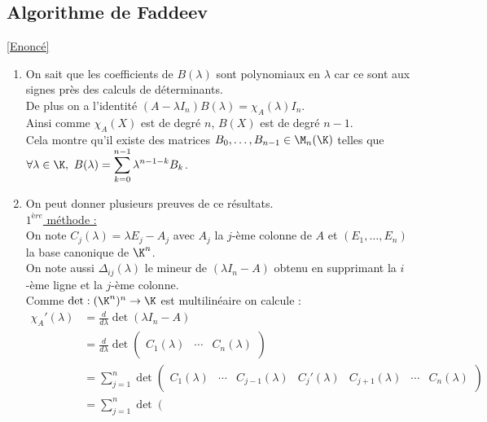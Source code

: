 \documentclass[8pt]{book}
\begin{document}
	\subsection{Algorithme de Faddeev}
	\label{Algorithme de Faddeev corrigé}
	\textcolor{blue}{\hyperref[Algorithme de Faddeev]{[Enoncé]}}\\
	\begin{enumerate}[leftmargin=*]
		\item On sait que les coefficients de $B(\lambda)$ sont polynomiaux en $\lambda$ car ce sont aux signes près des calculs de déterminants.\\
		De plus on a l'identité $(A-\lambda I_n)B(\lambda)=\chi_A(\lambda)I_n$.\\
		Ainsi comme $\chi_A(X)$ est de degré $n$, $B(X)$ est de degré $n-1$.\\
		Cela montre qu'il existe des matrices $B_0,\dots,B_{n-1}\in \M_n(\K)$ telles que $\forall \lambda\in \K,\ B(\lambda)=\displaystyle\sum_{k=0}^{n-1}\lambda^{n-1-k}B_k$.
		\item On peut donner plusieurs preuves de ce résultats.\\
		\underline{$1^{ère}$ méthode :}\\
		On note $C_j(\lambda)=\lambda E_j-A_j$ avec $A_j$ la $j$-ème colonne de $A$ et $(E_1,\dots,E_n)$ la base canonique de $\K^n$.\\
		On note aussi $\Delta_{ij}(\lambda)$ le mineur de $(\lambda I_n-A)$ obtenu en supprimant la $i$-ème ligne et la $j$-ème colonne.\\
		Comme $\det:(\K^n)^n\to\K$ est multilinéaire on calcule : 
		\begin{align*}
			\chi_A'(\lambda)&=\frac{d}{d\lambda}\det(\lambda I_n-A)\\
			&=\frac{d}{d\lambda}\det\left(\begin{array}{c|c|c}
				&&\\
				C_1(\lambda)&\cdots&C_n(\lambda)\\
				&&
			\end{array}\right)\\
			&=\sum_{j=1}^n\det\left(\begin{array}{c|c|c|c|c|c|c}
				&&&&&&\\
				C_1(\lambda)&\cdots&C_{j-1}(\lambda)&C_j'(\lambda)&C_{j+1}(\lambda)&\cdots&C_n(\lambda)\\
				&&&&&&
			\end{array}\right)\\
			&=\sum_{j=1}^n\det\left(\begin{array}{c|c|c|c|c|c|c}

\end{array}
\end{align*}
\end{enumerate}
\end{document}
